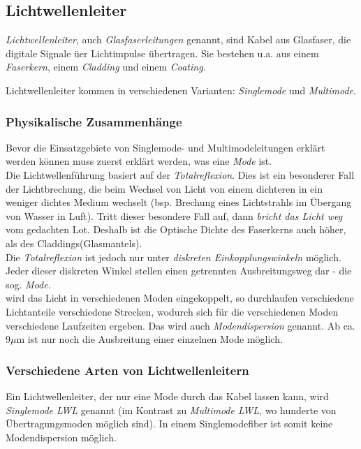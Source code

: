 \documentclass[a4paper, 12pt]{report}
\begin{document}
\begin{multicols}{2}
\subsection{Lichtwellenleiter}

\emph{Lichtwellenleiter}, auch \emph{Glasfaserleitungen} genannt, sind
Kabel aus Glasfaser, die digitale Signale üer Lichtimpulse übertragen. Sie
bestehen u.a. aus einem \emph{Faserkern}, einem \emph{Cladding} und einem
\emph{Coating}.

Lichtwellenleiter kommen in verschiedenen Varianten: \emph{Singlemode} und
\emph{Multimode}.

\subsubsection{Physikalische Zusammenhänge}

Bevor die Einsatzgebiete von Singlemode- und Multimodeleitungen erklärt werden
können muss zuerst erklärt werden, was eine \emph{Mode} ist. \\

Die Lichtwellenführung basiert auf der \emph{Totalreflexion}. Dies ist ein
besonderer Fall der Lichtbrechung, die beim Wechsel von Licht von einem
dichteren in ein weniger dichtes Medium wechselt (bsp. Brechung eines
Lichtstrahls im Übergang von Wasser in Luft). Tritt dieser besondere Fall auf,
dann \emph{bricht das Licht weg} vom gedachten \glqq Lot\grqq{}. Deshalb
ist die Optische Dichte des Faserkerns auch höher, als des
Claddings(Glasmantels). \\

Die \emph{Totalreflexion} ist jedoch nur unter \emph{diskreten
Einkopplungswinkeln} möglich. Jeder dieser diskreten Winkel stellen einen
getrennten Ausbreitungsweg dar - die sog. \emph{Mode}. \\

wird das Licht in verschiedenen Moden eingekoppelt, so durchlaufen verschiedene
Lichtanteile verschiedene Strecken, wodurch sich für die verschiedenen Moden
verschiedene Laufzeiten ergeben. Das wird auch \emph{Modendispersion}
genannt. Ab ca. 9$\mu$m ist nur noch die Ausbreitung einer einzelnen Mode
möglich.

\subsubsection{Verschiedene Arten von Lichtwellenleitern}

Ein Lichtwellenleiter, der nur eine Mode durch das Kabel lassen kann, wird
\emph{Singlemode LWL} genannt (im Kontrast zu \emph{Multimode LWL}, wo
hunderte von Übertragungsmoden möglich sind). In einem Singlemodefiber ist somit
keine Modendispersion möglich. \\


\end{multicols}
\end{document}
